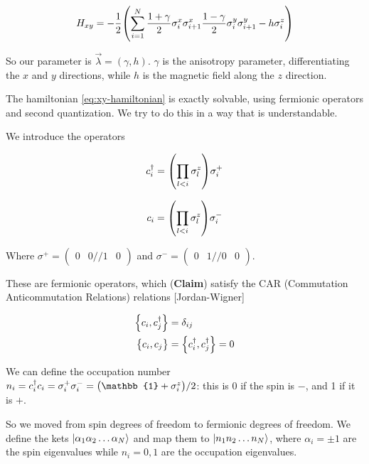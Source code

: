 \documentclass[main_zanardi.tex]{subfiles}
\begin{document}
\begin{equation} \label{eq:xy-hamiltonian}
  H_{xy} = -\frac{1}{2} \qty(\sum _{i=1}   ^{N} \frac{1 + \gamma}{2} \sigma_i ^x \sigma_{i+1}^x \frac{1-\gamma}{2} \sigma^y_i \sigma_{i+1}^y - h \sigma_i^{z} )
\end{equation}

So our parameter is \(\vec{\lambda} = (\gamma, h) \). \(\gamma\) is the anisotropy parameter, differentiating the \(x\) and \(y \) directions, while \(h\) is the magnetic field along the \(z\) direction.

The hamiltonian \eqref{eq:xy-hamiltonian} is exactly solvable, using fermionic operators and second quantization. We try to do this in a way that is understandable.

We introduce the operators

\begin{equation}
    c_i ^\dag = \qty(\prod _{l<i} \sigma_l^z) \sigma_i^+
\end{equation}

\begin{equation}
    c_i  = \qty(\prod _{l<i} \sigma_l^z) \sigma_i^-
\end{equation}

Where \(\sigma^+  = \begin{pmatrix}
    0 & 0 // 1 & 0
\end{pmatrix}\) and \(\sigma^-  = \begin{pmatrix}
    0 & 1 // 0 & 0
\end{pmatrix}\).

These are fermionic operators, which (\textbf{Claim})  satisfy the CAR (Commutation Anticommutation Relations) relations [Jordan-Wigner]

\begin{subequations}
\begin{align}
  \qty{c_i, c_j^\dag} &= \delta _{ij}   \\
  \qty{c_i, c_j} &= \qty{c_i^\dag, c_j^\dag} = 0
\end{align}
\end{subequations}

We can define the occupation number \(n_i = c_i^\dag c_i = \sigma_i^+ \sigma_i^- = \qty(\mathbb{1} + \sigma_i^z)/2\): this is 0 if the spin is \(-\), and 1 if it is \(+\).

So we moved from spin degrees of freedom to fermionic degrees of freedom. We define the kets \(\ket{\alpha_1 \alpha_2 \dots \alpha_N} \) and map them to \(\ket{n_1 n_2 \dots n_N} \), where \(\alpha_i = \pm 1\) are the spin eigenvalues while \(n_i = 0,1\) are the occupation eigenvalues.
\end{document}
